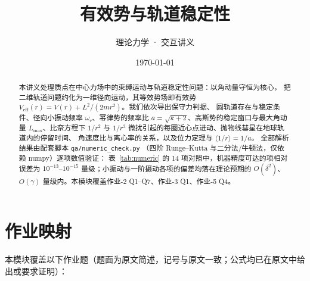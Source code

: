 \documentclass[UTF8,a4paper,11pt]{ctexart}
\title{\textbf{有效势与轨道稳定性}}
\author{理论力学 · 交互讲义}
\date{\today}
\begin{document}
\maketitle

\begin{abstract}
本讲义处理质点在中心力场中的束缚运动与轨道稳定性问题：以角动量守恒为核心，
把二维轨道问题约化为一维径向运动，其等效势场即有效势
$V_{\mathrm{eff}}(r)=V(r)+L^2/(2mr^2)$。我们依次导出保守力判据、
圆轨道存在与稳定条件、径向小振动频率 $\omega_r$、幂律势的频率比
$a=\sqrt{k+2}$、高斯势的稳定窗口与最大角动量 $L_{\max}$、比奈方程下
$1/r^2$ 与 $1/r^3$ 微扰引起的每圈近心点进动、抛物线彗星在地球轨道内的停留时间、
角速度比与离心率的关系，以及位力定理与 $\langle 1/r\rangle=1/a$。
全部解析结果由配套脚本 \texttt{qa/numeric\_check.py}
（四阶 Runge--Kutta 与二分法/牛顿法，仅依赖 numpy）逐项数值验证：
表~\ref{tab:numeric} 的 14 项对照中，机器精度可达的项相对误差为
$10^{-13}$--$10^{-15}$ 量级；小振动与一阶摄动各项的偏差均落在理论预期的
$O(\delta^2)$、$O(\gamma)$ 量级内。本模块覆盖作业-2 Q1--Q7、作业-3 Q1、作业-5 Q4。
\end{abstract}

\tableofcontents
\newpage

\section{作业映射}
\label{sec:map}

本模块覆盖以下作业题（题面为原文简述，记号与原文一致；公式均已在原文中给出或要求证明）：
\end{document}

